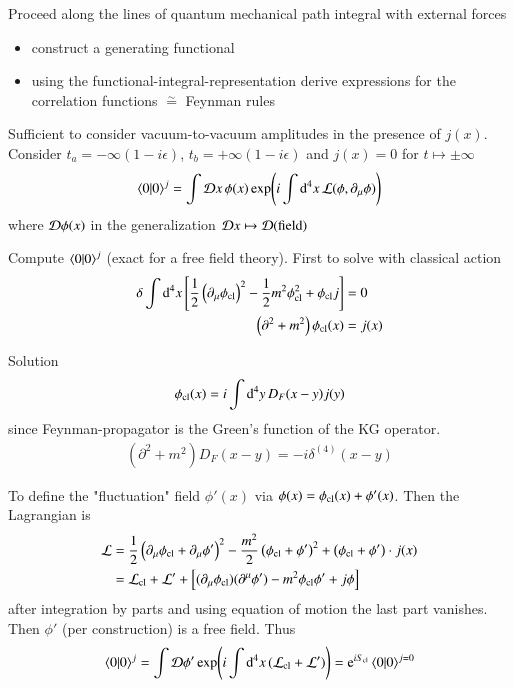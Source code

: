 Proceed along the lines of quantum mechanical path integral with external forces
\begin{itemize}
   \item construct a generating functional
   \item using the functional-integral-representation derive expressions for the correlation functions $\stackrel{\sim}{=}$ Feynman rules
\end{itemize}

Sufficient to consider vacuum-to-vacuum amplitudes in the presence of $j(x)$. Consider $t_a = -\infty(1-i\epsilon)$, $t_b = +\infty(1-i\epsilon)$ and $j(x) = 0$ for $t \mapsto \pm \infty$
\begin{align*}
   \braket{0 | 0}^j = \int \mathcal{D} x \, \phi(x) \exp(i\int \dd[4]{x}\mathcal{L}(\phi, \partial_\mu \phi))
\end{align*}
where $\mathcal{D} \phi(x)$ in the generalization $\mathcal{D} x \mapsto \mathcal{D} (\text{field})$

Compute $\braket{0|0}^j$ (exact for a free field theory). First to solve with classical action
\begin{align*}
   \delta \int \dd[4]{x} \left[ \frac{1}{2} \left( \partial_\mu \phi_{\text{cl}} \right)^2 - \frac{1}{2} m^2 \phi^2_{\text{cl}} + \phi_{\text{cl}}j \right] &= 0\\\
   \left( \partial^2 + m^2 \right) \phi_{\text{cl}}(x) &= j(x)
\end{align*}

Solution 
\begin{align}
   \phi_{\text{cl}}(x) = i \int \dd[4]{y} D_F(x-y) j(y)
\end{align}
since Feynman-propagator is the Green's function of the KG operator.
\begin{align}
   \left( \partial^2 + m^2 \right) D_F(x-y) = -i \delta^{(4)}(x-y)
\end{align}

To define the "fluctuation" field $\phi'(x)$ via $\phi(x) = \phi_{\text{cl}}(x) + \phi'(x)$. Then the Lagrangian is
\begin{align*}
   \mathcal{L} &= \frac{1}{2} \left( \partial_\mu \phi_{\text{cl}} + \partial_\mu \phi'\right)^2 -  \frac{m^2}{2} \left( \phi_{\text{cl}} + \phi' \right)^2 + \left( \phi_{\text{cl}} + \phi' \right) \cdot j(x) \\
        &= \mathcal{L}_{\text{cl}} + \mathcal{L}' + \left[ (\partial_\mu \phi_{\text{cl}}) (\partial^\mu \phi') - m^2 \phi_{\text{cl}} \phi' + j\phi \right] 
\end{align*}
after integration by parts and using equation of motion the last part vanishes. Then $\phi'$ (per construction) is a free field. Thus
\begin{align}
   \braket{0 | 0 }^j = \int \mathcal{D} \phi' \exp(i\int \dd[4]{x} (\mathcal{L}_{\text{cl}} + \mathcal{L}'))
   = \mathrm{e}^{iS_{\text{cl}}} \braket{0 | 0}^{j=0}
\end{align}

